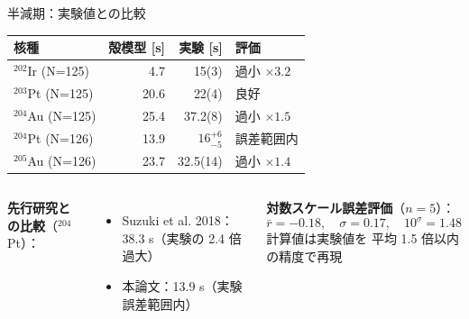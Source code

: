 \documentclass[aspectratio=169,12pt]{beamer}
\begin{document}
\begin{frame}{半減期：実験値との比較}
  \begin{center}
  \renewcommand{\arraystretch}{1.4}
  \begin{tabular}{lrrl}
    \toprule
    核種 & 殻模型 [s] & 実験 [s] & 評価 \\
    \midrule
    $^{202}$Ir (N=125) & 4.7  & 15(3)  & 過小 $\times 3.2$ \\
    $^{203}$Pt (N=125) & 20.6 & 22(4)  & 良好 \\
    $^{204}$Au (N=125) & 25.4 & 37.2(8) & 過小 $\times 1.5$ \\
    \alert{$^{204}$Pt (N=126)} & \alert{13.9} & \alert{$16^{+6}_{-5}$} & \alert{誤差範囲内} \\
    $^{205}$Au (N=126) & 23.7 & 32.5(14) & 過小 $\times 1.4$ \\
    \bottomrule
  \end{tabular}
  \end{center}

  \begin{columns}
    \textbf{先行研究との比較}（$^{204}$Pt）：
    \begin{itemize}
      \item Suzuki et al. 2018：38.3 s（実験の 2.4 倍過大）
      \item 本論文：13.9 s（\alert{実験誤差範囲内}）
    \end{itemize}

    \textbf{対数スケール誤差評価}（$n=5$）：
    \begin{equation*}
      \bar{r} = -0.18,\quad \sigma = 0.17,\quad 10^\sigma = 1.48
    \end{equation*}
    計算値は実験値を \alert{平均 1.5 倍以内}の精度で再現
  \end{columns}
\end{frame}
\end{document}

